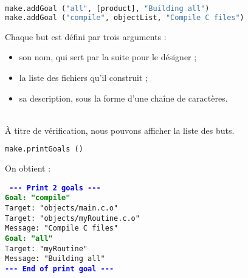 \documentclass[a4paper,11pt]{extarticle}
\begin{document}
\begin{lstlisting}[language=py]
make.addGoal ("all", [product], "Building all")
make.addGoal ("compile", objectList, "Compile C files")
\end{lstlisting}
Chaque but est défini par trois arguments :
\begin{itemize}
\item son nom, qui sert par la suite pour le désigner ;
\item la liste des fichiers qu'il construit ;
\item sa description, sous la forme d'une chaîne de caractères.
\end{itemize}

~\\À titre de vérification, nous pouvons afficher la liste des buts.
\begin{lstlisting}[language=py]
make.printGoals ()
\end{lstlisting}

On obtient :

\begin{mdframed}[hidealllines=true,backgroundcolor=lightgray!20]
\tt\footnotesize
\textcolor{blue}{\bf{-}{-}{-} Print 2 goals {-}{-}{-}}\\
\textcolor{green}{\bf Goal: "compile"}\\
\hspace*{1.2em}Target: "objects/main.c.o"\\
\hspace*{1.2em}Target: "objects/myRoutine.c.o"\\
\hspace*{1.2em}Message: "Compile C files"\\
\textcolor{green}{\bf Goal: "all"}\\
\hspace*{1.2em}Target: "myRoutine"\\
\hspace*{1.2em}Message: "Building all"\\
\textcolor{blue}{\bf{-}{-}{-} End of print goal {-}{-}{-}}
\end{mdframed}
\end{document}
